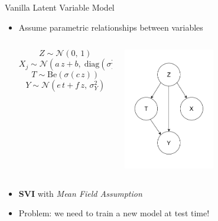 \documentclass[10pt]{beamer}
\begin{document}
 \begin{frame}{Vanilla Latent Variable Model}
     \begin{itemize}
         \item Assume parametric relationships between variables
         \begin{columns}
              \begin{column}{0.75\textwidth}
                  \begin{equation*}
                    Z \sim \mathcal{N}(0,\,1)
                  \end{equation*}
                  \begin{equation*}
                    X_j \sim \mathcal{N}(a\,z + b,\; \text{diag}(\sigma_X^2))
                  \end{equation*}
                  \begin{equation*}
                    T \sim \mathrm{Be}(\sigma(c\,z))
                  \end{equation*}
                  \begin{equation*}
                    Y \sim \mathcal{N}(e\,t + f\,z,\,\sigma_Y^2)
                  \end{equation*}
              \end{column}
              \begin{column}{0.5\textwidth}
                  \includegraphics[width=0.5\textwidth]{images/model.jpg}
              \end{column}
         \end{columns}

         \item \textbf{SVI} with \textit{Mean Field Assumption}
          \item \alert{Problem:} we need to train a new model at test time!
     \end{itemize}
 \end{frame}
\end{document}
